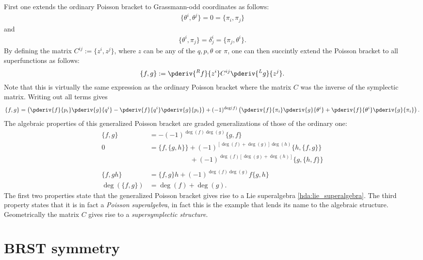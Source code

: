     First one extends the ordinary Poisson bracket to Grassmann-odd coordinates as follows:
    \begin{gather}
        \{\theta^i,\theta^j\} = 0 = \{\pi_i,\pi_j\}
    \end{gather}
    and
    \begin{gather}
        \{\theta^i,\pi_j\} = \delta^i_j = \{\pi_j,\theta^i\}.
    \end{gather}
    By defining the matrix $C^{ij} := \{z^i,z^j\}$, where $z$ can be any of the $q,p,\theta$ or $\pi$, one can then succintly extend the Poisson bracket to all superfunctions as follows:
    \begin{gather}
        \{f,g\} := \pderiv{^Rf}{z^i}C^{ij}\pderiv{^Lg}{z^j}.
    \end{gather}
    Note that this is virtually the same expression as the ordinary Poisson bracket where the matrix $C$ was the inverse of the symplectic matrix. Writing out all terms gives
    \begin{gather}
        \{f,g\} = \left(\pderiv{f}{p_i}\pderiv{g}{q^i}-\pderiv{f}{q^i}\pderiv{g}{p_i}\right) + (-1)^{\deg(f)}\left(\pderiv{f}{\pi_i}\pderiv{g}{\theta^i} + \pderiv{f}{\theta^i}\pderiv{g}{\pi_i}\right).
    \end{gather}
    The algebraic properties of this generalized Poisson bracket are graded generalizations of those of the ordinary one:
    \begin{align}
        \{f,g\} &= -(-1)^{\deg(f)\deg(g)}\{g,f\}\\
        0 &= \{f,\{g,h\}\} + (-1)^{[\deg(f)+\deg(g)]\deg(h)}\{h,\{f,g\}\}\nonumber\\
        &\ \phantom{= \{f,\{g,h\}\} } + (-1)^{\deg(f)[\deg(g)+\deg(h)]}\{g,\{h,f\}\}\\\nonumber\\
        \{f,gh\} &= \{f,g\}h + (-1)^{\deg(f)\deg(g)}f\{g,h\}\\
        \deg(\{f,g\}) &= \deg(f)+\deg(g).
    \end{align}
    The first two properties state that the generalized Poisson bracket gives rise to a Lie superalgebra \ref{hda:lie_superalgebra}. The third property states that it is in fact a \textit{Poisson superalgebra}, in fact this is the example that lends its name to the algebraic structure. Geometrically the matrix $C$ gives rise to a \textit{supersymplectic structure}.

\section{BRST symmetry}\label{section:classical_brst}
